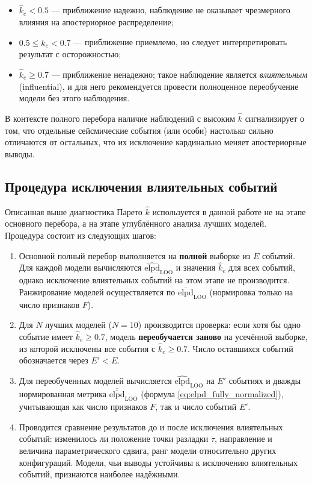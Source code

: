 \documentclass[14pt]{mmcs_article}
\begin{document}
	\begin{itemize}
		\item $\hat{k}_e < 0.5$ — приближение надежно, наблюдение
		не оказывает чрезмерного влияния на апостериорное
		распределение;
		\item $0.5 \leq \hat{k}_e < 0.7$ — приближение приемлемо,
		но следует интерпретировать результат с
		осторожностью;
		\item $\hat{k}_e \geq 0.7$ — приближение ненадежно; такое
		наблюдение является \textit{влиятельным}
		(influential), и для него рекомендуется провести
		полноценное переобучение модели без этого
		наблюдения.
	\end{itemize}
	
	В контексте полного перебора наличие наблюдений с высоким
	$\hat{k}$ сигнализирует о том, что отдельные сейсмические
	события (или особи) настолько сильно отличаются от остальных,
	что их исключение кардинально меняет апостериорные выводы.
	
	\subsection*{Процедура исключения влиятельных событий}
	
	Описанная выше диагностика Парето $\hat{k}$ используется в
	данной работе не на этапе основного перебора, а на этапе
	углублённого анализа лучших моделей. Процедура состоит из
	следующих шагов:
	
	\begin{enumerate}
		\item Основной полный перебор выполняется на \textbf{полной}
		выборке из $E$ событий. Для каждой модели вычисляются
		$\widehat{\mathrm{elpd}}_{\mathrm{LOO}}$ и значения
		$\hat{k}_e$ для всех событий, однако исключение
		влиятельных событий на этом этапе не производится.
		Ранжирование моделей осуществляется по
		$\overline{\mathrm{elpd}}_{\mathrm{LOO}}$ (нормировка
		только на число признаков $F$).
		
		\item Для $N$ лучших моделей ($N = 10$) производится
		проверка: если хотя бы одно событие имеет
		$\hat{k}_e \geq 0.7$, модель \textbf{переобучается
			заново} на усечённой выборке, из которой исключены
		все события с $\hat{k}_e \geq 0.7$. Число оставшихся
		событий обозначается через $E' < E$.
		
		\item Для переобученных моделей вычисляется
		$\widehat{\mathrm{elpd}}_{\mathrm{LOO}}$ на $E'$
		событиях и дважды нормированная метрика
		$\overline{\overline{\mathrm{elpd}}}_{\mathrm{LOO}}$
		(формула \eqref{eq:elpd_fully_normalized}),
		учитывающая как число признаков $F$, так и число
		событий $E'$.
		
		\item Проводится сравнение результатов до и после
		исключения влиятельных событий: изменилось ли
		положение точки разладки $\tau$, направление и
		величина параметрического сдвига, ранг модели
		относительно других конфигураций. Модели, чьи
		выводы устойчивы к исключению влиятельных событий,
		признаются наиболее надёжными.
	\end{enumerate}
	
\end{document}
